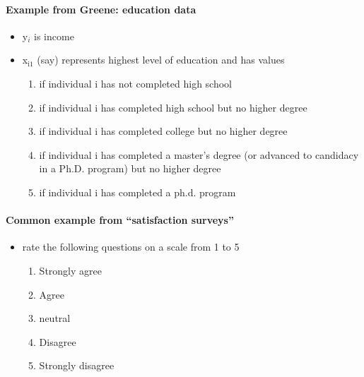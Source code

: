 \paragraph{Example from Greene: education data}
\begin{itemize}
\item y$_i$ is income
\item x$_{\mathrm{i1}}$ (say) represents highest level of education and has
          values
\begin{enumerate}
\item if individual i has not completed high school
\item if individual i has completed high school but no higher
             degree
\item if individual i has completed college but no higher
             degree
\item if individual i has completed a master's degree (or
             advanced to candidacy in a Ph.D. program) but no higher
             degree
\item if individual i has completed a ph.d. program
\end{enumerate}
\end{itemize}

\paragraph{Common example from ``satisfaction surveys''}
\begin{itemize}
\item rate the following questions on a scale from 1 to 5
\begin{enumerate}
\item Strongly agree
\item Agree
\item neutral
\item Disagree
\item Strongly disagree
\end{enumerate}
\end{itemize}

